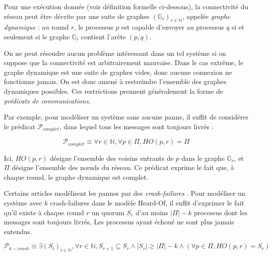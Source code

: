 \documentclass{article}
\begin{document}
Pour une exécution donnée (voir définition formelle ci-dessous), la connectivité du réseau peut être décrite par une suite de graphes $(\mathds{G}_r)_{r \in \mathds{N}}$, appelée \textit{graphe dynamique} :
au round $r$, le processus $p$ est capable d'envoyer au processus $q$ si et seulement si le graphe $\mathds{G}_r$ contient l'arête $(p,q)$.

On ne peut résoudre aucun problème intéressant dans un tel système si on suppose que la connectivité est arbitrairement mauvaise. Dans le cas extrême, le graphe dynamique est une suite de graphes vides, 
donc aucune connexion ne fonctionne jamais.
On est donc amené à restreindre l'ensemble des graphes dynamiques possibles. Ces restrictions prennent généralement la forme de \emph{prédicats de communications}.




Par exemple, pour modéliser un système sans aucune panne, il suffit de considérer le prédicat $\mathcal{P}_{complet}$, dans lequel tous les messages sont toujours livrés :

$$\mathcal{P}_{complet} \equiv \forall r \in \mathds{N}, \forall p \in \Pi, HO(p, r) = \Pi$$

Ici, $HO(p, r)$ désigne l'ensemble des voisins entrants de $p$ dans le graphe $\mathds{G}_r$, et $\Pi$ désigne l'ensemble des nœuds du réseau.
Ce prédicat exprime le fait que, à chaque round, le graphe dynamique est complet.

Certains articles modélisent les pannes par des \emph{crash-failures} \cite{dds}.
Pour modéliser un système avec $k$ crash-failures dans le modèle Heard-Of,
il suffit d'exprimer le fait qu'il existe à chaque round $r$ un quorum $S_r$ d'au moins $|\Pi| - k$ processus dont les messages sont toujours livrés,
Les processus ayant échoué ne sont plus jamais entendus.

$$\mathcal{P}_{k-crash} \equiv \exists (S_i)_{i \in \mathds{N}}, \forall r \in \mathds{N}, S_{r+1} \subseteq S_r \wedge |S_r| \geq |\Pi| - k \wedge (\forall p \in \Pi, HO(p, r) = S_r)$$
\end{document}
